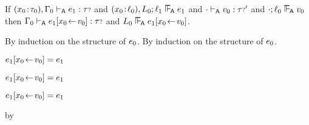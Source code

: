 \begin{lemma}\label{A-label-substitution}\leavevmode
  If\/ $(x_0\!:\!\tau_0),\Gamma_0 \vdash_{\mathsf{A}} e_1 : {\tau{\scriptstyle ?}}$
  and\/ $\fcons{\tann{\svar_0}{\sowner_0}}\sownerenv_0; \sowner_1 \sWLA \sexpr_1$
  and\/ ${\cdot} \vdash_{\mathsf{A}} v_0 : {\tau{\scriptstyle ?}}'$
  and\/ $\snil; \sowner_0 \sWLA \svalue_0$
  then\/ $\Gamma_0 \vdash_{\mathsf{A}} e_1[x_0\!\leftarrow\!v_0] : {\tau{\scriptstyle ?}}$
  and\/ $\sownerenv_0 \sWLA \esubst{\sexpr_1}{\svar_0}{\svalue_0}$.
\end{lemma}{
  \newcommand{\shortproof}{By induction on the structure of $\sexpr_0$.}
\begin{lamportproof*}
  \shortproof
\mainproof
  \shortproof

    \begin{pfproof}
        \begin{pfproof}
          \qedstep
        \end{pfproof}
        \begin{pfproof}
          \qedstep
            \begin{pfproof}
              $e_1[x_0\!\leftarrow\!v_0] = e_1$
            \end{pfproof}
        \end{pfproof}
    \end{pfproof}

    \begin{pfproof}
      \qedstep
        \begin{pfproof}
          $e_1[x_0\!\leftarrow\!v_0] = e_1$
        \end{pfproof}
    \end{pfproof}

    \begin{pfproof}
        \begin{pfproof}
          \qedstep
            \begin{pfproof}
              $e_1[x_0\!\leftarrow\!v_0] = e_1$
            \end{pfproof}
        \end{pfproof}
        \begin{pfproof}
          \qedstep
            \begin{pfproof}
              by \pfih
            \end{pfproof}
        \end{pfproof}
    \end{pfproof}


\end{lamportproof*}}
